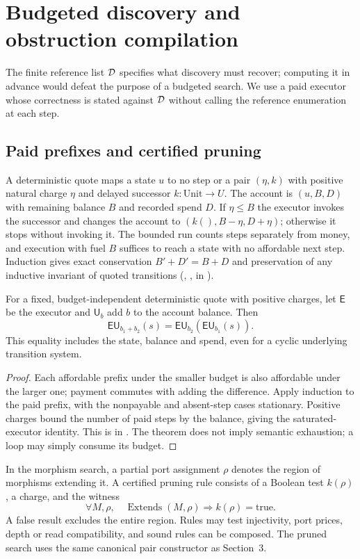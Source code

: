 \section{Budgeted discovery and obstruction compilation}\label{sec:obstruction}
The finite reference list $\mathcal D$ specifies what discovery must recover; computing it in advance would defeat the purpose of a budgeted search. We use a paid executor whose correctness is stated against $\mathcal D$ without calling the reference enumeration at each step.

\subsection{Paid prefixes and certified pruning}
A deterministic quote maps a state $u$ to no step or a pair $(\eta, k)$ with positive natural charge $\eta$ and delayed successor $k:\mathrm{Unit}\to U$. The account is $(u,B,D)$ with remaining balance $B$ and recorded spend $D$. If $\eta\le B$ the executor invokes the successor and changes the account to $(k(),B-\eta,D+\eta)$; otherwise it stops without invoking it. The bounded run counts steps separately from money, and execution with fuel $B$ suffices to reach a state with no affordable next step. Induction gives exact conservation $B'+D'=B+D$ and preservation of any inductive invariant of quoted transitions (, ,  in ).

\begin{theorem}\label{thm:resume}
For a fixed, budget-independent deterministic quote with positive charges, let $\mathsf E$ be the executor and $\mathsf U_b$ add $b$ to the account balance. Then
\[
 \mathsf E\mathsf U_{b_1+b_2}(s)=\mathsf E\mathsf U_{b_2}(\mathsf E\mathsf U_{b_1}(s)).
\]
This equality includes the state, balance and spend, even for a cyclic underlying transition system.
\end{theorem}
\begin{proof}
Each affordable prefix under the smaller budget is also affordable under the larger one; payment commutes with adding the difference. Apply induction to the paid prefix, with the nonpayable and absent-step cases stationary. Positive charges bound the number of paid steps by the balance, giving the saturated-executor identity. This is  in . The theorem does not imply semantic exhaustion; a loop may simply consume its budget.
\end{proof}
In the morphism search, a partial port assignment $\rho$ denotes the region of morphisms extending it. A certified pruning rule consists of a Boolean test $k(\rho)$, a charge, and the witness
\[
 \forall M,\rho,\quad \operatorname{Extends}(M,\rho)\Longrightarrow k(\rho)=\mathrm{true}.
\]
A false result excludes the entire region. Rules may test injectivity, port prices, depth or read compatibility, and sound rules can be composed. The pruned search uses the same canonical pair constructor as Section~3.

